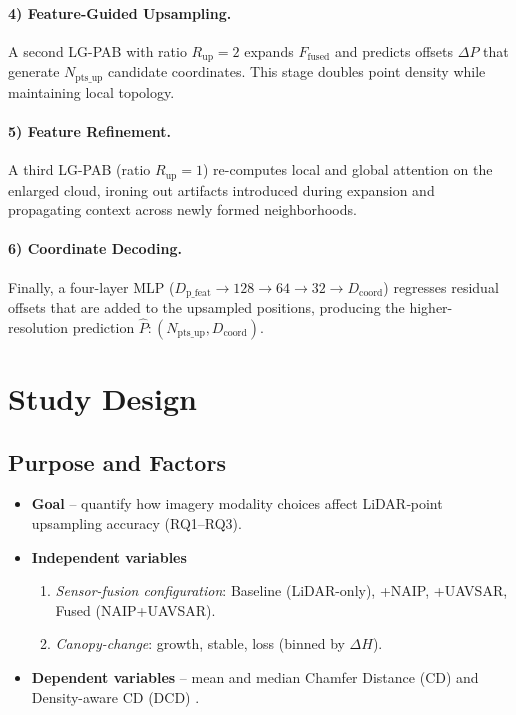 \documentclass[preprint,12pt,authoryear]{elsarticle}
\begin{document}
\paragraph{4) Feature-Guided Upsampling.}
A second LG-PAB with ratio $R_{\text{up}}=2$ expands $F_{\text{fused}}$ and predicts offsets $\Delta P$ that generate $N_{\text{pts\_up}}$ candidate coordinates. This stage doubles point density while maintaining local topology.

\paragraph{5) Feature Refinement.}
A third LG-PAB (ratio $R_{\text{up}}=1$) re-computes local and global attention on the enlarged cloud, ironing out artifacts introduced during expansion and propagating context across newly formed neighborhoods.

\paragraph{6) Coordinate Decoding.}
Finally, a four-layer MLP ($D_{\text{p\_feat}} \rightarrow 128 \rightarrow 64 \rightarrow 32 \rightarrow D_{\text{coord}}$) regresses residual offsets that are added to the upsampled positions, producing the higher-resolution prediction $\hat{P}: (N_{\text{pts\_up}}, D_{\text{coord}})$.

\section{Study Design}
\label{sec:study_design}

\subsection{Purpose and Factors}
\begin{itemize}[leftmargin=*]
    \item \textbf{Goal} – quantify how imagery modality choices affect LiDAR‐point upsampling accuracy (RQ1–RQ3).
    \item \textbf{Independent variables}
        \begin{enumerate}[label=(\alph*)]
            \item \emph{Sensor-fusion configuration}: Baseline (LiDAR-only), +NAIP, +UAVSAR, Fused (NAIP+UAVSAR).
            \item \emph{Canopy-change}: growth, stable, loss (binned by $\Delta H$).
        \end{enumerate}
    \item \textbf{Dependent variables} – mean and median Chamfer Distance (CD)\cite{barrow_parametric_1977} and Density-aware CD (DCD)\citep{wu_density-aware_2021} .
\end{itemize}
\end{document}
